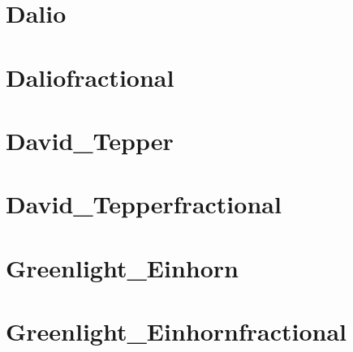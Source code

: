 \documentclass[letterpaper,10pt,english]{sphinxmanual}
\begin{document}
\sphinxstepscope


\chapter{Dalio}
\label{\detokenize{Dalio2021-09-30:dalio}}\label{\detokenize{Dalio2021-09-30::doc}}
\noindent{}

\sphinxstepscope


\chapter{Daliofractional}
\label{\detokenize{Daliofractional2021-09-30:daliofractional}}\label{\detokenize{Daliofractional2021-09-30::doc}}
\noindent{}

\sphinxstepscope


\chapter{David\_Tepper}
\label{\detokenize{David_Tepper2021-09-30:david-tepper}}\label{\detokenize{David_Tepper2021-09-30::doc}}
\noindent{}

\sphinxstepscope


\chapter{David\_Tepperfractional}
\label{\detokenize{David_Tepperfractional2021-09-30:david-tepperfractional}}\label{\detokenize{David_Tepperfractional2021-09-30::doc}}
\noindent{}

\sphinxstepscope


\chapter{Greenlight\_Einhorn}
\label{\detokenize{Greenlight_Einhorn2021-09-30:greenlight-einhorn}}\label{\detokenize{Greenlight_Einhorn2021-09-30::doc}}
\noindent{}

\sphinxstepscope


\chapter{Greenlight\_Einhornfractional}
\label{\detokenize{Greenlight_Einhornfractional2021-09-30:greenlight-einhornfractional}}\label{\detokenize{Greenlight_Einhornfractional2021-09-30::doc}}
\noindent{}
\end{document}
